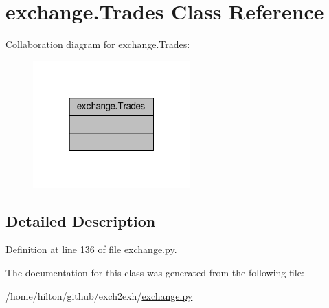 \hypertarget{classexchange_1_1_trades}{}\section{exchange.\+Trades Class Reference}
\label{classexchange_1_1_trades}


Collaboration diagram for exchange.\+Trades\+:\nopagebreak
\begin{figure}[H]
\begin{center}
\leavevmode
\includegraphics[width=172pt]{classexchange_1_1_trades__coll__graph}
\end{center}
\end{figure}


\subsection{Detailed Description}


Definition at line \hyperlink{exchange_8py_source_l00136}{136} of file \hyperlink{exchange_8py_source}{exchange.\+py}.



The documentation for this class was generated from the following file\+:\begin{DoxyCompactItemize}
\item 
/home/hilton/github/exch2exh/\hyperlink{exchange_8py}{exchange.\+py}\end{DoxyCompactItemize}
